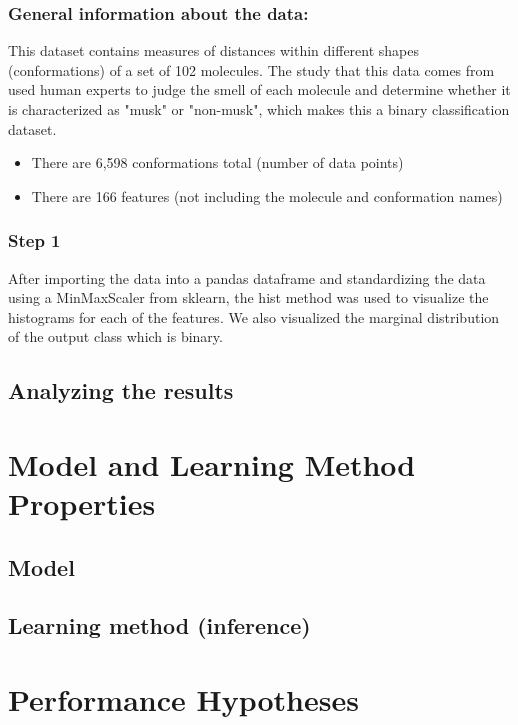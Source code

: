 \documentclass[12pt]{article}
\begin{document}
\subsubsection{General information about the data:}

This dataset contains measures of distances within different shapes (conformations) of a set of 102 molecules. The study that this data comes from used human experts to judge the smell of each molecule and determine whether it is characterized as "musk" or "non-musk", which makes this a binary classification dataset.
\begin{itemize}
\item There are 6,598 conformations total (number of data points)
\item There are 166 features (not including the molecule and conformation names)
\end{itemize}

\subsubsection{Step 1}

After importing the data into a pandas dataframe and standardizing the data using a MinMaxScaler from sklearn, the  hist method was used to visualize the histograms for each of the features. We also visualized the marginal distribution of the output class which is binary.


\subsection{Analyzing the results}


\section{Model and Learning Method Properties}
  

\subsection{Model}


\subsection{Learning method (inference)}

\section{Performance Hypotheses}
\end{document}
